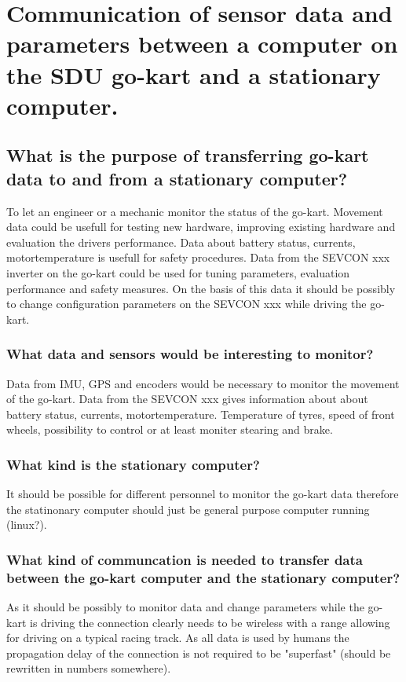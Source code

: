 
\section{Communication of sensor data and parameters between a computer on the SDU go-kart and a stationary computer.}
\subsection{What is the purpose of transferring go-kart data to and from a stationary computer?}
To let an engineer or a mechanic monitor the status of the go-kart.
Movement data could be usefull for testing new hardware, improving existing hardware and evaluation the drivers performance. 
Data about battery status, currents, motortemperature is usefull for safety procedures.
Data from the SEVCON xxx inverter on the go-kart could be used for tuning parameters, evaluation performance and safety measures.
On the basis of this data it should be possibly to change configuration parameters on the SEVCON xxx while driving the go-kart.

\subsubsection*{What data and sensors would be interesting to monitor?}
Data from IMU, GPS and encoders would be necessary to monitor the movement of the go-kart.
Data from the SEVCON xxx gives information about about battery status, currents, motortemperature.
Temperature of tyres, speed of front wheels, possibility to control or at least moniter stearing and brake.

\subsubsection*{What kind is the stationary computer?}
It should be possible for different personnel to monitor the go-kart data therefore the statinonary computer should just be general purpose computer running (linux?).

\subsubsection*{What kind of communcation is needed to transfer data between the go-kart computer and the stationary computer?}
As it should be possibly to monitor data and change parameters while the go-kart is driving the connection clearly needs to be wireless with a range allowing for driving on a typical racing track. 
As all data is used by humans the propagation delay of the connection is not required to be "superfast" (should be rewritten in numbers somewhere).

